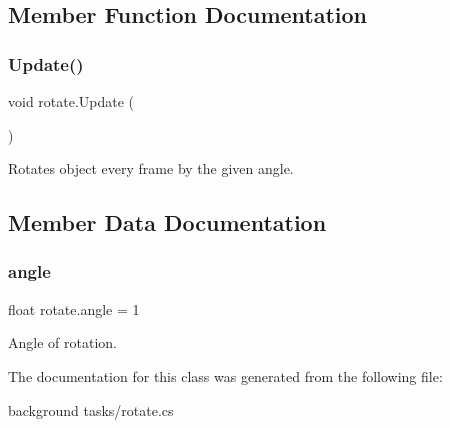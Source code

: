 \subsection{Member Function Documentation}
\mbox{\label{classrotate_a4005d36825adc52547585541c3ddbd22}} 
\subsubsection{\texorpdfstring{Update()}{Update()}}
{\footnotesize\ttfamily void rotate.\+Update (\begin{DoxyParamCaption}{ }\end{DoxyParamCaption})\hspace{0.3cm}{\ttfamily [private]}}



Rotates object every frame by the given angle. 



\subsection{Member Data Documentation}
\mbox{\label{classrotate_aad45a318094d5f91273252034e63b78b}} 
\subsubsection{\texorpdfstring{angle}{angle}}
{\footnotesize\ttfamily float rotate.\+angle = 1}



Angle of rotation. 



The documentation for this class was generated from the following file\+:\begin{DoxyCompactItemize}
\item 
background tasks/rotate.\+cs\end{DoxyCompactItemize}

